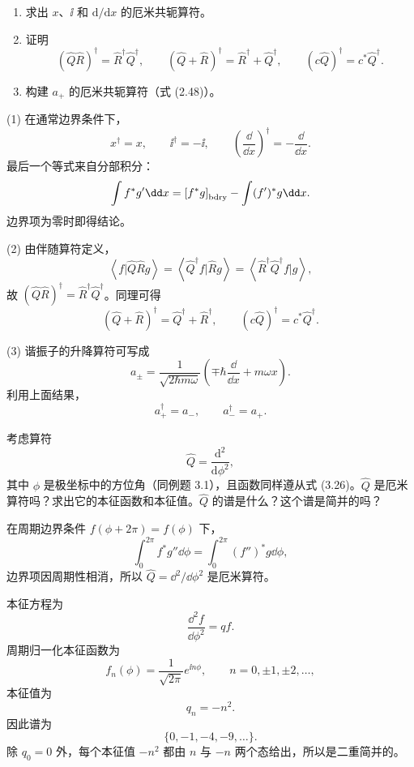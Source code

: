 \begin{question}
\begin{enumerate}
\item 求出 $x$、$\ii$ 和 $\mathrm d/\mathrm dx$ 的厄米共轭算符。
\item 证明
\[
(\hat Q\hat R)^\dagger=\hat R^\dagger\hat Q^\dagger,
\qquad
(\hat Q+\hat R)^\dagger=\hat R^\dagger+\hat Q^\dagger,
\qquad
(c\hat Q)^\dagger=c^*\hat Q^\dagger .
\]
\item 构建 $a_+$ 的厄米共轭算符（式 (2.48)）。
\end{enumerate}

\par\smallskip
{}

\end{question}
\begin{solution}
(1) 在通常边界条件下，
\[
x^\dagger=x,
\qquad
\ii^\dagger=-\ii,
\qquad
\left(\frac{\dd}{\dd x}\right)^\dagger=-\frac{\dd}{\dd x}.
\]
最后一个等式来自分部积分：
\[
\int f^*g'\dd x=\left[f^*g\right]_{\rm bdry}-\int (f')^*g\dd x.
\]
边界项为零时即得结论。

(2) 由伴随算符定义，
\[
\left\langle f|\hat Q\hat Rg \right\rangle=\left\langle \hat Q^\dagger f|\hat Rg \right\rangle
=\left\langle \hat R^\dagger\hat Q^\dagger f|g \right\rangle,
\]
故 $(\hat Q\hat R)^\dagger=\hat R^\dagger\hat Q^\dagger$。同理可得
\[
(\hat Q+\hat R)^\dagger=\hat Q^\dagger+\hat R^\dagger,
\qquad
(c\hat Q)^\dagger=c^*\hat Q^\dagger.
\]

(3) 谐振子的升降算符可写成
\[
a_\pm=\frac1{\sqrt{2\hbar m\omega}}\left(\mp\hbar\frac{\dd}{\dd x}+m\omega x\right).
\]
利用上面结果，
\[
\boxed{a_+^\dagger=a_-},
\qquad
\boxed{a_-^\dagger=a_+}.
\]
\end{solution}

\begin{question}
考虑算符
\[
\hat Q=\frac{\mathrm d^2}{\mathrm d\phi^2},
\]
其中 $\phi$ 是极坐标中的方位角（同例题 3.1），且函数同样遵从式 (3.26)。$\hat Q$ 是厄米算符吗？求出它的本征函数和本征值。$\hat Q$ 的谱是什么？这个谱是简并的吗？

\par\smallskip
{}

\end{question}
\begin{solution}
在周期边界条件 $f(\phi+2\pi)=f(\phi)$ 下，
\[
\int_0^{2\pi} f^*g''\dd\phi
=\int_0^{2\pi} (f'')^*g\dd\phi,
\]
边界项因周期性相消，所以 $\hat Q=\dd^2/\dd\phi^2$ 是厄米算符。

本征方程为
\[
\frac{\dd^2 f}{\dd\phi^2}=qf.
\]
周期归一化本征函数为
\[
f_n(\phi)=\frac1{\sqrt{2\pi}}e^{\ii n\phi},
\qquad n=0,\pm1,\pm2,\ldots,
\]
本征值为
\[
q_n=-n^2.
\]
因此谱为
\[
\{0,-1,-4,-9,\ldots\}.
\]
除 $q_0=0$ 外，每个本征值 $-n^2$ 都由 $n$ 与 $-n$ 两个态给出，所以是二重简并的。
\end{solution}


